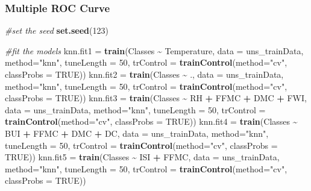 \documentclass[
]{article}
\newenvironment{Shaded}{\begin{snugshade}}{\end{snugshade}}
\newcommand{\AttributeTok}[1]{\textcolor[rgb]{0.13,0.29,0.53}{#1}}
\newcommand{\CommentTok}[1]{\textcolor[rgb]{0.56,0.35,0.01}{\textit{#1}}}
\newcommand{\ConstantTok}[1]{\textcolor[rgb]{0.56,0.35,0.01}{#1}}
\newcommand{\DecValTok}[1]{\textcolor[rgb]{0.00,0.00,0.81}{#1}}
\newcommand{\FunctionTok}[1]{\textcolor[rgb]{0.13,0.29,0.53}{\textbf{#1}}}
\newcommand{\NormalTok}[1]{#1}
\newcommand{\OtherTok}[1]{\textcolor[rgb]{0.56,0.35,0.01}{#1}}
\newcommand{\SpecialCharTok}[1]{\textcolor[rgb]{0.81,0.36,0.00}{\textbf{#1}}}
\newcommand{\StringTok}[1]{\textcolor[rgb]{0.31,0.60,0.02}{#1}}
\begin{document}
\subsubsection{Multiple ROC Curve}\label{multiple-roc-curve-3}

\begin{Shaded}
\begin{Highlighting}[]
\CommentTok{\#set the seed}
\FunctionTok{set.seed}\NormalTok{(}\DecValTok{123}\NormalTok{)}

\CommentTok{\#fit the models}
\NormalTok{knn.fit1 }\OtherTok{=} \FunctionTok{train}\NormalTok{(Classes }\SpecialCharTok{\textasciitilde{}}\NormalTok{ Temperature, }\AttributeTok{data =}\NormalTok{ uns\_trainData, }\AttributeTok{method=}\StringTok{"knn"}\NormalTok{, }\AttributeTok{tuneLength =} \DecValTok{50}\NormalTok{, }\AttributeTok{trControl =} \FunctionTok{trainControl}\NormalTok{(}\AttributeTok{method=}\StringTok{"cv"}\NormalTok{, }\AttributeTok{classProbs =} \ConstantTok{TRUE}\NormalTok{))}
\NormalTok{knn.fit2 }\OtherTok{=} \FunctionTok{train}\NormalTok{(Classes }\SpecialCharTok{\textasciitilde{}}\NormalTok{ ., }\AttributeTok{data =}\NormalTok{ uns\_trainData, }\AttributeTok{method=}\StringTok{"knn"}\NormalTok{, }\AttributeTok{tuneLength =} \DecValTok{50}\NormalTok{, }\AttributeTok{trControl =} \FunctionTok{trainControl}\NormalTok{(}\AttributeTok{method=}\StringTok{"cv"}\NormalTok{, }\AttributeTok{classProbs =} \ConstantTok{TRUE}\NormalTok{))}
\NormalTok{knn.fit3 }\OtherTok{=} \FunctionTok{train}\NormalTok{(Classes }\SpecialCharTok{\textasciitilde{}}\NormalTok{ RH }\SpecialCharTok{+}\NormalTok{ FFMC }\SpecialCharTok{+}\NormalTok{ DMC }\SpecialCharTok{+}\NormalTok{ FWI, }\AttributeTok{data =}\NormalTok{ uns\_trainData, }\AttributeTok{method=}\StringTok{"knn"}\NormalTok{, }\AttributeTok{tuneLength =} \DecValTok{50}\NormalTok{, }\AttributeTok{trControl =} \FunctionTok{trainControl}\NormalTok{(}\AttributeTok{method=}\StringTok{"cv"}\NormalTok{, }\AttributeTok{classProbs =} \ConstantTok{TRUE}\NormalTok{))}
\NormalTok{knn.fit4 }\OtherTok{=} \FunctionTok{train}\NormalTok{(Classes }\SpecialCharTok{\textasciitilde{}}\NormalTok{ BUI }\SpecialCharTok{+}\NormalTok{ FFMC }\SpecialCharTok{+}\NormalTok{ DMC }\SpecialCharTok{+}\NormalTok{ DC, }\AttributeTok{data =}\NormalTok{ uns\_trainData, }\AttributeTok{method=}\StringTok{"knn"}\NormalTok{, }\AttributeTok{tuneLength =} \DecValTok{50}\NormalTok{, }\AttributeTok{trControl =} \FunctionTok{trainControl}\NormalTok{(}\AttributeTok{method=}\StringTok{"cv"}\NormalTok{, }\AttributeTok{classProbs =} \ConstantTok{TRUE}\NormalTok{))}
\NormalTok{knn.fit5 }\OtherTok{=} \FunctionTok{train}\NormalTok{(Classes }\SpecialCharTok{\textasciitilde{}}\NormalTok{ ISI }\SpecialCharTok{+}\NormalTok{ FFMC, }\AttributeTok{data =}\NormalTok{ uns\_trainData, }\AttributeTok{method=}\StringTok{"knn"}\NormalTok{, }\AttributeTok{tuneLength =} \DecValTok{50}\NormalTok{, }\AttributeTok{trControl =} \FunctionTok{trainControl}\NormalTok{(}\AttributeTok{method=}\StringTok{"cv"}\NormalTok{, }\AttributeTok{classProbs =} \ConstantTok{TRUE}\NormalTok{))}


\end{Highlighting}
\end{Shaded}
\end{document}
